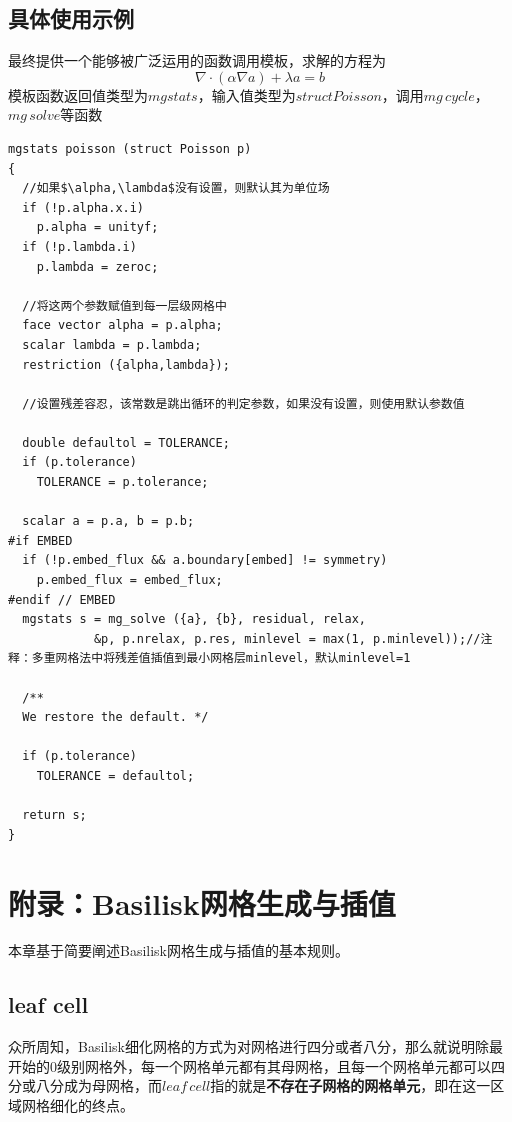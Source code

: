 \documentclass[lang=cn,11pt,a4paper]{elegantpaper}
\begin{document}
\subsection{具体使用示例}\label{sec:example}
最终提供一个能够被广泛运用的函数调用模板，求解的方程为
\begin{equation}
    \nabla \cdot (\alpha \nabla a)+\lambda a=b
\end{equation}
模板函数返回值类型为$mgstats$，输入值类型为$struct Poisson$，调用$mg \,cycle$，$mg \,solve$等函数
\begin{verbatim}
mgstats poisson (struct Poisson p)
{
  //如果$\alpha,\lambda$没有设置，则默认其为单位场
  if (!p.alpha.x.i)
    p.alpha = unityf;
  if (!p.lambda.i)
    p.lambda = zeroc;

  //将这两个参数赋值到每一层级网格中
  face vector alpha = p.alpha;
  scalar lambda = p.lambda;
  restriction ({alpha,lambda});

  //设置残差容忍，该常数是跳出循环的判定参数，如果没有设置，则使用默认参数值

  double defaultol = TOLERANCE;
  if (p.tolerance)
    TOLERANCE = p.tolerance;

  scalar a = p.a, b = p.b;
#if EMBED
  if (!p.embed_flux && a.boundary[embed] != symmetry)
    p.embed_flux = embed_flux;
#endif // EMBED
  mgstats s = mg_solve ({a}, {b}, residual, relax,
            &p, p.nrelax, p.res, minlevel = max(1, p.minlevel));//注释：多重网格法中将残差值插值到最小网格层minlevel，默认minlevel=1

  /**
  We restore the default. */

  if (p.tolerance)
    TOLERANCE = defaultol;

  return s;
}

\end{verbatim}
\section{附录：Basilisk网格生成与插值}
本章基于\cite{popinet2015quadtree}简要阐述Basilisk网格生成与插值的基本规则。
\subsection{leaf cell}
众所周知，Basilisk细化网格的方式为对网格进行四分或者八分，那么就说明除最开始的0级别网格外，每一个网格单元都有其母网格，且每一个网格单元都可以四分或八分成为母网格，而$leaf\, cell$指的就是\textbf{不存在子网格的网格单元}，即在这一区域网格细化的终点。
\end{document}

